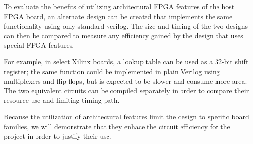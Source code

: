 To evaluate the benefits of utilizing architectural FPGA features of the host FPGA board, an alternate design can be created that implements the same functionality using only standard verilog.
The size and timing of the two designs can then be compared to measure any efficiency gained by the design that uses special FPGA features.

For example, in select Xilinx boards, a lookup table can be used as a 32-bit shift register; the same function could be implemented in plain Verilog using multiplexers and flip-flops, but is expected to be slower and consume more area.
The two equivalent circuits can be compiled separately in order to compare their resource use and limiting timing path.

Because the utilization of architectural features limit the design to specific board families, we will demonstrate that they enhace the circuit efficiency for the project in order to justify their use.

